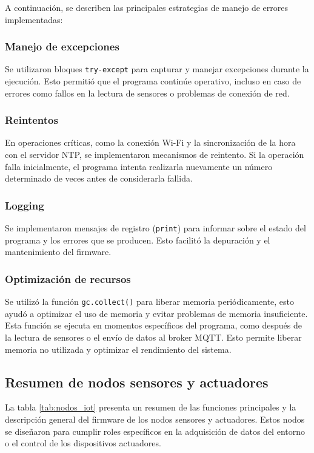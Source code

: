 A continuación, se describen las principales estrategias de manejo de errores
implementadas:

\subsubsection{Manejo de excepciones}

Se utilizaron bloques \texttt{try-except} para capturar y manejar excepciones
durante la ejecución. Esto permitió que el programa continúe operativo, incluso
en caso de errores como fallos en la lectura de sensores o problemas de
conexión de red.

\subsubsection{Reintentos}

En operaciones críticas, como la conexión Wi-Fi y la sincronización de la hora
con el servidor NTP, se implementaron mecanismos de reintento. Si la operación
falla inicialmente, el programa intenta realizarla nuevamente un número
determinado de veces antes de considerarla fallida.

\subsubsection{Logging}

Se implementaron mensajes de registro (\texttt{print}) para informar sobre el
estado del programa y los errores que se producen. Esto facilitó la depuración
y el mantenimiento del firmware.

\subsubsection{Optimización de recursos}

Se utilizó la función \texttt{gc.collect()} para liberar memoria
periódicamente, esto ayudó a optimizar el uso de memoria y evitar problemas de
memoria insuficiente. Esta función se ejecuta en momentos específicos del
programa, como después de la lectura de sensores o el envío de datos al broker
MQTT. Esto permite liberar memoria no utilizada y optimizar el rendimiento del
sistema.

\subsection{Resumen de nodos sensores y actuadores}

La tabla \ref{tab:nodos_iot} presenta un resumen de las funciones principales y
la descripción general del firmware de los nodos sensores y actuadores. Estos
nodos se diseñaron para cumplir roles específicos en la adquisición de datos
del entorno o el control de los dispositivos actuadores.

